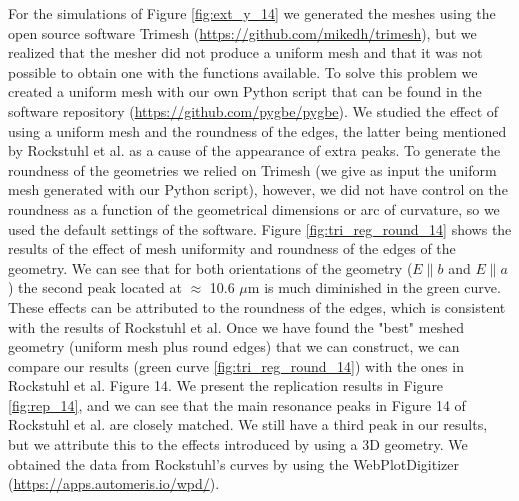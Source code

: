 For the simulations of Figure \ref{fig:ext_y_14} we generated the meshes using the open source software Trimesh (\url{https://github.com/mikedh/trimesh}), 
but we realized that the mesher did not produce a uniform mesh and that it was not possible to obtain one with the functions available. To solve this problem 
we created a uniform mesh with our own Python script that can be found in the software repository (\url{https://github.com/pygbe/pygbe}). We studied the 
effect of using a uniform mesh and the roundness of the edges, the latter being mentioned by Rockstuhl et al. as a cause of the appearance of extra peaks. To 
generate the roundness of the geometries we relied on Trimesh (we give as input the uniform mesh generated with our Python script), however, we did not have 
control on the roundness as a function of the geometrical dimensions or arc of curvature, so we used the default settings of
the software. Figure \ref{fig:tri_reg_round_14} shows the results of the effect of mesh uniformity and roundness of the edges of the geometry. We can see 
that for both orientations of the geometry ($E\parallel b$ and $E\parallel a$) the second peak located at $\approx$ 10.6 $\mu$m is much diminished in the
green curve. These effects can be attributed to the roundness of the edges, which is consistent with the results of Rockstuhl et al. Once we have found the
"best" meshed geometry (uniform mesh plus round edges) that we can construct, we can compare our results (green curve \ref{fig:tri_reg_round_14}) with the ones
in Rockstuhl et al. Figure 14. We present the replication results in Figure \ref{fig:rep_14}, and we can see that the main resonance peaks in Figure 14 of 
Rockstuhl et al. are closely matched. We still have a third peak in our results, but we attribute this to the effects introduced by using a 3D geometry. We 
obtained the data from Rockstuhl's curves by using the WebPlotDigitizer (\url{https://apps.automeris.io/wpd/}).
 

